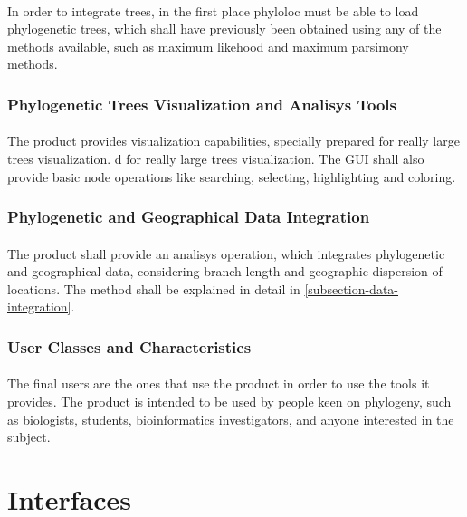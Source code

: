 \documentclass[10pt,a4paper]{article}
\begin{document}
\paragraph{}
In order to integrate trees, in the first place phyloloc must be able to load phylogenetic trees, which shall have previously been obtained using any of the methods available, such as maximum likehood and maximum parsimony methods. 

\subsubsection{Phylogenetic Trees Visualization and Analisys Tools}
\paragraph{}
The product provides visualization capabilities, specially prepared for really large trees visualization.
d for really large trees visualization. The GUI shall also provide basic node operations like searching, selecting, highlighting and coloring.

\subsubsection{Phylogenetic and Geographical Data Integration} 
\paragraph{}
The product shall provide an analisys operation, which integrates phylogenetic and geographical data, considering branch length and geographic dispersion of locations. The method shall be explained in detail in \ref{subsection-data-integration}.

\subsubsection{User Classes and Characteristics}
\paragraph{}
The final users are the ones that use the product in order to use the tools it provides. The product is intended to be used by people keen on phylogeny, such as biologists, students, bioinformatics investigators, and anyone interested in the subject.





\section{Interfaces}
  \label{section-int}
\end{document}
